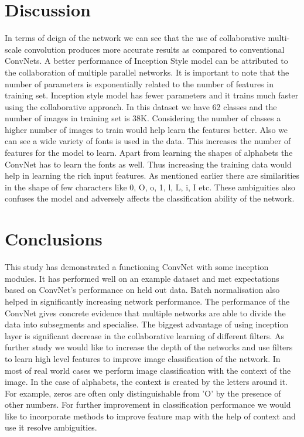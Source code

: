 \documentclass[fleqn,10pt]{SelfArx} %
\begin{document}
\section{Discussion}
In terms of deign of the network we can see that the use of collaborative multi-scale convolution produces more accurate results as compared to conventional ConvNets. A better performance of Inception Style model can be attributed to the collaboration of multiple parallel networks. It is important to note that the number of parameters is exponentially related to the number of features in training set. Inception style model has fewer parameters and it trains much faster using the collaborative approach.
\newline
In this dataset we have 62 classes and the number of images in training set is 38K. Considering the number of classes a higher number of images to train would help learn the features better. Also we can see a wide variety of fonts is used in the data. This increases the number of features for the model to learn. Apart from learning the shapes of alphabets the ConvNet has to learn the fonts as well. Thus increasing the training data would help in learning the rich input features.
\newline
As mentioned earlier there are similarities in the shape of few characters like 0, O, o, 1, l, L, i, I etc. These ambiguities also confuses the model and adversely affects the classification ability of the network. 

\section{Conclusions}
This study has demonstrated a functioning ConvNet with some inception modules. It has performed well on an example dataset and met expectations based on ConvNet's performance on held out data. Batch normalisation also helped in significantly increasing network performance.  
\newline
The performance of the ConvNet gives concrete evidence that multiple networks are able to divide the data into subsegments and specialise. The biggest advantage of using inception layer is significant decrease in the collaborative learning of different filters. As further study we would like to increase the depth of the networks and use filters to learn high level features to improve image classification of the network.
\newline
In most of real world cases we perform image classification with the context of the image. In the case of alphabets, the context is created by the letters around it. For example, zeros are often only distinguishable from 'O' by the presence of other numbers. For further improvement in classification performance we would like to incorporate methods to improve feature map with the help of context and use it resolve ambiguities.
\end{document}
